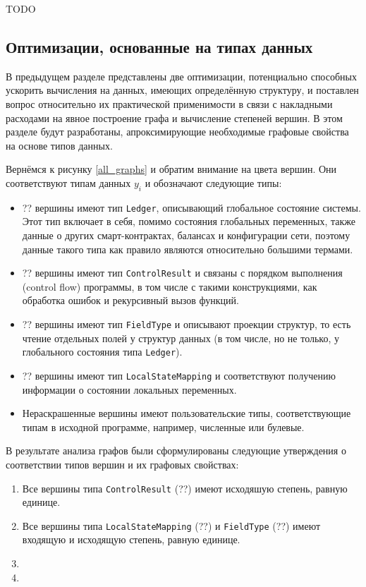 \documentclass[../diploma.tex]{subfiles}
\begin{document}
TODO

\subsection{Оптимизации, основанные на типах данных}\label{typebased}

В предыдущем разделе представлены две оптимизации, потенциально способных ускорить вычисления на данных, имеющих определённую структуру, и поставлен вопрос относительно их практической применимости в связи с накладными расходами на явное построение графа и вычисление степеней вершин. В этом разделе будут разработаны, апроксимирующие необходимые графовые свойства на основе типов данных.

Вернёмся к рисунку \ref{all_graphs} и обратим внимание на цвета вершин. Они соответствуют типам данных $y_i$ и обозначают следующие типы:

\begin{itemize}
    \item ?? вершины имеют тип \texttt{Ledger}, описывающий глобальное состояние системы. Этот тип включает в себя, помимо состояния глобальных переменных, также данные о других смарт-контрактах, балансах и конфигурации сети, поэтому данные такого типа как правило являются относительно большими термами.
    \item ?? вершины имеют тип \texttt{ControlResult} и связаны с порядком выполнения (control flow) программы, в том числе с такими конструкциями, как обработка ошибок и рекурсивный вызов функций.
    \item ?? вершины имеют тип \texttt{FieldType} и описывают проекции структур, то есть чтение отдельных полей у структур данных (в том числе, но не только, у глобального состояния типа \texttt{Ledger}).
    \item ?? вершины имеют тип \texttt{LocalStateMapping} и соответствуют получению информации о состоянии локальных переменных.
    \item Нераскрашенные вершины имеют пользовательские типы, соответствующие типам в исходной программе, например, численные или булевые.
\end{itemize}

В результате анализа графов были сформулированы следующие утверждения о соответствии типов вершин и их графовых свойствах:

\begin{enumerate}
    \item Все вершины типа \texttt{ControlResult} (??) имеют исходяшую степень, равную единице.
    \item Все вершины типа \texttt{LocalStateMapping} (??) и \texttt{FieldType} (??) имеют входящую и исходящую степень, равную единице.
    \item
    \item
\end{enumerate}
\end{document}
